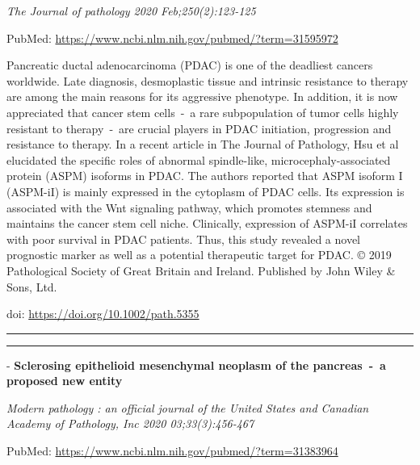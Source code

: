 \documentclass[
]{article}
\begin{document}
\emph{The Journal of pathology 2020 Feb;250(2):123-125}

PubMed: \url{https://www.ncbi.nlm.nih.gov/pubmed/?term=31595972}

Pancreatic ductal adenocarcinoma (PDAC) is one of the deadliest cancers
worldwide. Late diagnosis, desmoplastic tissue and intrinsic resistance
to therapy are among the main reasons for its aggressive phenotype. In
addition, it is now appreciated that cancer stem cells~-~a rare
subpopulation of tumor cells highly resistant to therapy~-~are crucial
players in PDAC initiation, progression and resistance to therapy. In a
recent article in The Journal of Pathology, Hsu et al elucidated the
specific roles of abnormal spindle-like, microcephaly-associated protein
(ASPM) isoforms in PDAC. The authors reported that ASPM isoform I
(ASPM-iI) is mainly expressed in the cytoplasm of PDAC cells. Its
expression is associated with the Wnt signaling pathway, which promotes
stemness and maintains the cancer stem cell niche. Clinically,
expression of ASPM-iI correlates with poor survival in PDAC patients.
Thus, this study revealed a novel prognostic marker as well as a
potential therapeutic target for PDAC. © 2019 Pathological Society of
Great Britain and Ireland. Published by John Wiley \& Sons, Ltd.

doi: \url{https://doi.org/10.1002/path.5355}

\begin{center}\rule{0.5\linewidth}{0.5pt}\end{center}

\begin{center}\rule{0.5\linewidth}{0.5pt}\end{center}

- \textbf{Sclerosing epithelioid mesenchymal neoplasm of the
pancreas~-~a proposed new entity}

\emph{Modern pathology : an official journal of the United States and
Canadian Academy of Pathology, Inc 2020 03;33(3):456-467}

PubMed: \url{https://www.ncbi.nlm.nih.gov/pubmed/?term=31383964}
\end{document}
